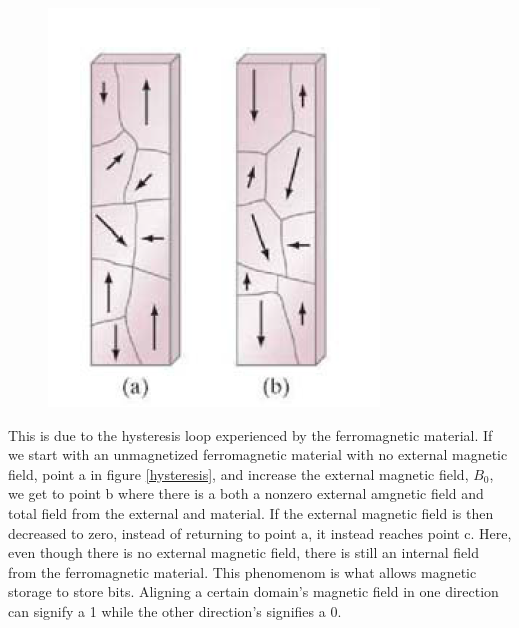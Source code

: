 \documentclass[ aip, 12pt]{revtex4-1} %
\begin{document}
\begin{figure}[H]
\centerline{\includegraphics[scale=.45]{magneticDomain.png}}
\caption{ }
\label{domain}
\end{figure} 
This is due to the hysteresis loop experienced by the ferromagnetic material. If we start with an unmagnetized ferromagnetic material with no external magnetic field, point a in figure \ref{hysteresis}, and increase the external magnetic field, $B_0$, we get to point b where there is a both a nonzero external amgnetic field and total field from the external and material. If the external magnetic field is then decreased to zero, instead of returning to point a, it instead reaches point c. Here, even though there is no external magnetic field, there is still an internal field from the ferromagnetic material. This phenomenom is what allows magnetic storage to store bits. Aligning a certain domain's magnetic field in one direction can signify a 1 while the other direction's signifies a 0.
\end{document}
